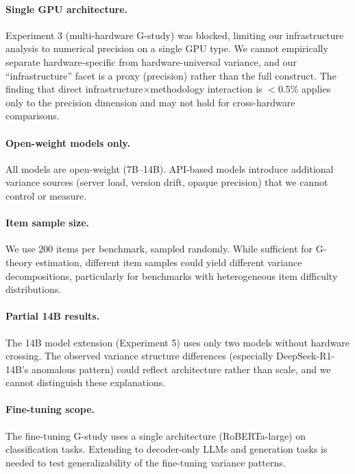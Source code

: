 \documentclass[letterpaper]{article}
\begin{document}
\paragraph{Single GPU architecture.}
Experiment 3 (multi-hardware G-study) was blocked, limiting our infrastructure analysis to numerical precision on a single GPU type.
We cannot empirically separate hardware-specific from hardware-universal variance, and our ``infrastructure'' facet is a proxy (precision) rather than the full construct.
The finding that direct infrastructure$\times$methodology interaction is $<$0.5\% applies only to the precision dimension and may not hold for cross-hardware comparisons.

\paragraph{Open-weight models only.}
All models are open-weight (7B--14B).
API-based models introduce additional variance sources (server load, version drift, opaque precision) that we cannot control or measure.

\paragraph{Item sample size.}
We use 200 items per benchmark, sampled randomly.
While sufficient for G-theory estimation, different item samples could yield different variance decompositions, particularly for benchmarks with heterogeneous item difficulty distributions.

\paragraph{Partial 14B results.}
The 14B model extension (Experiment 5) uses only two models without hardware crossing.
The observed variance structure differences (especially DeepSeek-R1-14B's anomalous pattern) could reflect architecture rather than scale, and we cannot distinguish these explanations.

\paragraph{Fine-tuning scope.}
The fine-tuning G-study uses a single architecture (RoBERTa-large) on classification tasks.
Extending to decoder-only LLMs and generation tasks is needed to test generalizability of the fine-tuning variance patterns.


\end{document}
